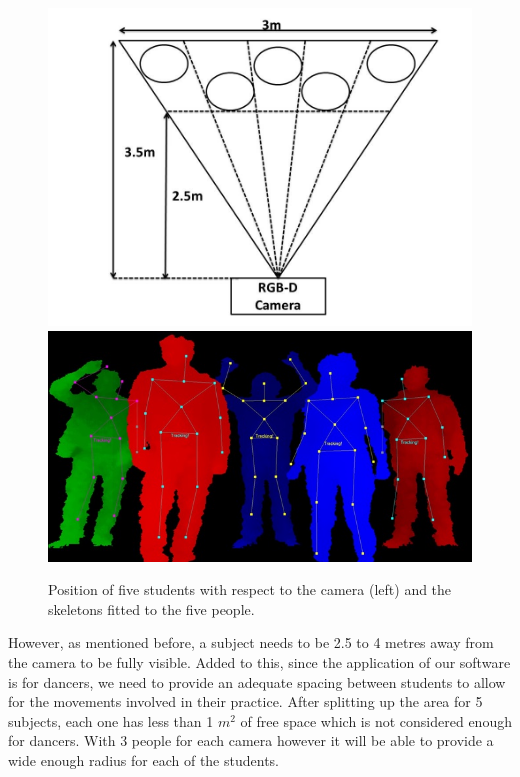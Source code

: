 \documentclass[10pt,a4paper]{article}
\begin{document}
\begin{figure}[H]
\centering
\includegraphics[scale=0.25]{multi_people1.jpg}
\includegraphics[scale=0.6]{multi_people2.jpg}
\caption{Position of five students with respect to the camera (left) and the skeletons fitted to the five people.}
\label{people_pos}
\end{figure}
\noindent
However, as mentioned before, a subject needs to be 2.5 to 4 metres away from the camera to be fully visible. Added to this, since the application of our software is for dancers, we need to provide an adequate spacing between students to allow for the movements involved in their practice. After splitting up the area for 5 subjects, each one has less than 1 $m^2$ of free space which is not considered enough for dancers. With 3 people for each camera however it will be able to provide a wide enough radius for each of the students.
\end{document}
